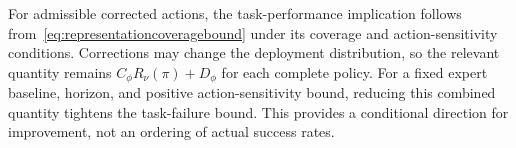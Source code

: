For admissible corrected actions, the task-performance implication follows from~\eqref{eq:representationcoveragebound} under its coverage and action-sensitivity conditions.
Corrections may change the deployment distribution, so the relevant quantity remains $C_\phi R_\nu(\pi)+D_\phi$ for each complete policy.
For a fixed expert baseline, horizon, and positive action-sensitivity bound, reducing this combined quantity tightens the task-failure bound.
This provides a conditional direction for improvement, not an ordering of actual success rates.
